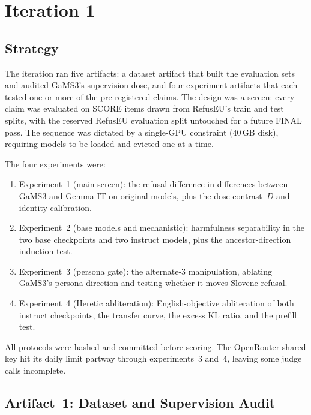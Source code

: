 \documentclass[11pt,letterpaper]{article}
\begin{document}
\section{Iteration 1}

\subsection{Strategy}

The iteration ran five artifacts: a dataset artifact that built the evaluation sets and audited GaMS3's supervision dose, and four experiment artifacts that each tested one or more of the pre-registered claims. The design was a screen: every claim was evaluated on SCORE items drawn from RefusEU's train and test splits, with the reserved RefusEU evaluation split untouched for a future FINAL pass. The sequence was dictated by a single-GPU constraint (40\,GB disk), requiring models to be loaded and evicted one at a time.

The four experiments were:
\begin{enumerate}
  \item Experiment~1 (main screen): the refusal difference-in-differences between GaMS3 and Gemma-IT on original models, plus the dose contrast~$D$ and identity calibration.
  \item Experiment~2 (base models and mechanistic): harmfulness separability in the two base checkpoints and two instruct models, plus the ancestor-direction induction test.
  \item Experiment~3 (persona gate): the alternate-3 manipulation, ablating GaMS3's persona direction and testing whether it moves Slovene refusal.
  \item Experiment~4 (Heretic abliteration): English-objective abliteration of both instruct checkpoints, the transfer curve, the excess KL ratio, and the prefill test.
\end{enumerate}

All protocols were hashed and committed before scoring. The OpenRouter shared key hit its daily limit partway through experiments~3 and~4, leaving some judge calls incomplete.

\subsection{Artifact~1: Dataset and Supervision Audit}
\label{gen_art_dataset_1}
\end{document}
